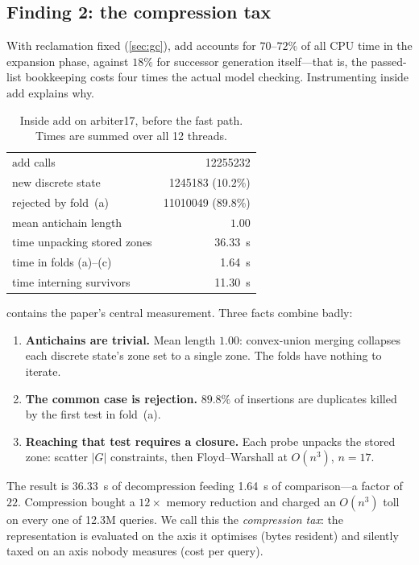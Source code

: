 \subsection{Finding 2: the compression tax}\label{sec:tax}

With reclamation fixed (\cref{sec:gc}), $\mathrm{add}$ accounts for $70$--$72\%$
of all CPU time in the expansion phase, against $18\%$ for successor generation
itself---that is, the passed-list bookkeeping costs four times the actual model
checking.  Instrumenting inside $\mathrm{add}$ explains why.

\begin{table}[t]
\centering
\caption{Inside $\mathrm{add}$ on arbiter17, before the fast path.  Times are
summed over all 12 threads.}
\label{tab:addprof}
\begin{tabular}{lr}
\toprule
$\mathrm{add}$ calls & \num{12255232} \\
\quad new discrete state & \num{1245183} ($10.2\%$) \\
\quad rejected by fold~(a) & \num{11010049} ($89.8\%$) \\
mean antichain length & $1.00$ \\
\midrule
time unpacking stored zones & \SI{36.33}{\second} \\
time in folds (a)--(c) & \SI{1.64}{\second} \\
time interning survivors & \SI{11.30}{\second} \\
\bottomrule
\end{tabular}
\end{table}

 contains the paper's central measurement.  Three facts
combine badly:

\begin{enumerate}
  \item \textbf{Antichains are trivial.}  Mean length $1.00$: convex-union
        merging collapses each discrete state's zone set to a single zone.  The
        folds have nothing to iterate.
  \item \textbf{The common case is rejection.}  $89.8\%$ of insertions are
        duplicates killed by the first test in fold~(a).
  \item \textbf{Reaching that test requires a closure.}  Each probe unpacks the
        stored zone: scatter $|G|$ constraints, then Floyd--Warshall at
        $O(n^3)$, $n = 17$.
\end{enumerate}

The result is \SI{36.33}{\second} of decompression feeding \SI{1.64}{\second} of
comparison---a factor of $22$.  Compression bought a $12\times$ memory
reduction and charged an $O(n^3)$ toll on every one of \num{12.3}{M} queries.
We call this the \emph{compression tax}: the representation is evaluated on the
axis it optimises (bytes resident) and silently taxed on an axis nobody
measures (cost per query).

